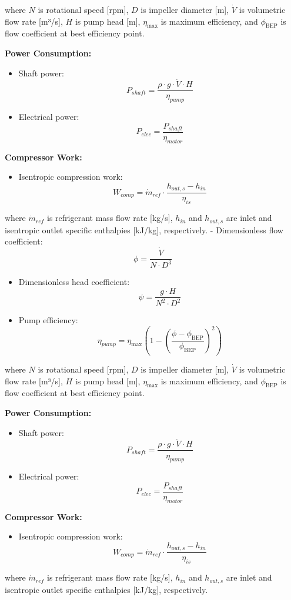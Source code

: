 \documentclass[journal=iecr,manuscript=]{achemso}
\providecommand{\tightlist}{%
  \setlength{\itemsep}{0pt}\setlength{\parskip}{0pt}}
\begin{document}
where \(N\) is rotational speed {[}rpm{]}, \(D\) is impeller diameter
{[}m{]}, \(\dot{V}\) is volumetric flow rate {[}m³/s{]}, \(H\) is pump
head {[}m{]}, \(\eta_{\text{max}}\) is maximum efficiency, and
\(\phi_{\text{BEP}}\) is flow coefficient at best efficiency point.

\textbf{Power Consumption:}

\begin{itemize}
\item
  Shaft power:
  \[P_{shaft} = \frac{\rho \cdot g \cdot \dot{V} \cdot H}{\eta_{pump}}\]
\item
  Electrical power: \[P_{elec} = \frac{P_{shaft}}{\eta_{motor}}\]
\end{itemize}

\textbf{Compressor Work:}

\begin{itemize}
\tightlist
\item
  Isentropic compression work:
  \[W_{comp} = \dot{m}_{ref} \cdot \frac{h_{out,s} - h_{in}}{\eta_{is}}\]
\end{itemize}

where \(\dot{m}_{ref}\) is refrigerant mass flow rate {[}kg/s{]},
\(h_{in}\) and \(h_{out,s}\) are inlet and isentropic outlet specific
enthalpies {[}kJ/kg{]}, respectively. - Dimensionless flow coefficient:
\[\phi = \frac{\dot{V}}{N \cdot D^3}\]

\begin{itemize}
\item
  Dimensionless head coefficient:
  \[\psi = \frac{g \cdot H}{N^2 \cdot D^2}\]
\item
  Pump efficiency:
  \[\eta_{pump} = \eta_{\text{max}} \left(1 - \left(\frac{\phi - \phi_{\text{BEP}}}{\phi_{\text{BEP}}}\right)^2\right)\]
\end{itemize}

where \(N\) is rotational speed {[}rpm{]}, \(D\) is impeller diameter
{[}m{]}, \(\dot{V}\) is volumetric flow rate {[}m³/s{]}, \(H\) is pump
head {[}m{]}, \(\eta_{\text{max}}\) is maximum efficiency, and
\(\phi_{\text{BEP}}\) is flow coefficient at best efficiency point.

\textbf{Power Consumption:}

\begin{itemize}
\item
  Shaft power:
  \[P_{shaft} = \frac{\rho \cdot g \cdot \dot{V} \cdot H}{\eta_{pump}}\]
\item
  Electrical power: \[P_{elec} = \frac{P_{shaft}}{\eta_{motor}}\]
\end{itemize}

\textbf{Compressor Work:}

\begin{itemize}
\tightlist
\item
  Isentropic compression work:
  \[W_{comp} = \dot{m}_{ref} \cdot \frac{h_{out,s} - h_{in}}{\eta_{is}}\]
\end{itemize}

where \(\dot{m}_{ref}\) is refrigerant mass flow rate {[}kg/s{]},
\(h_{in}\) and \(h_{out,s}\) are inlet and isentropic outlet specific
enthalpies {[}kJ/kg{]}, respectively.



\end{document}
